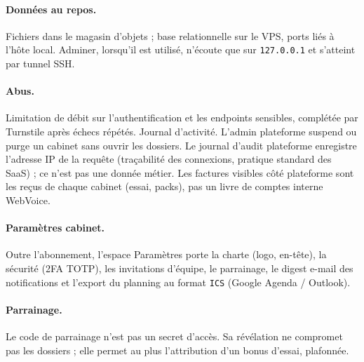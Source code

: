 \paragraph{Données au repos.}
Fichiers dans le magasin d'objets ; base relationnelle sur le VPS, ports liés à l'hôte local. Adminer, lorsqu'il est utilisé, n'écoute que sur \texttt{127.0.0.1} et s'atteint par tunnel SSH.

\paragraph{Abus.}
Limitation de débit sur l'authentification et les endpoints sensibles, complétée par Turnstile après échecs répétés. Journal d'activité. L'admin plateforme suspend ou purge un cabinet sans ouvrir les dossiers. Le journal d'audit plateforme enregistre l'adresse IP de la requête (traçabilité des connexions, pratique standard des SaaS) ; ce n'est pas une donnée métier. Les factures visibles côté plateforme sont les reçus de chaque cabinet (essai, packs), pas un livre de comptes interne WebVoice.

\paragraph{Paramètres cabinet.}
Outre l'abonnement, l'espace Paramètres porte la charte (logo, en-tête), la sécurité (2FA TOTP), les invitations d'équipe, le parrainage, le digest e-mail des notifications et l'export du planning au format \texttt{ICS} (Google Agenda / Outlook).

\paragraph{Parrainage.}
Le code de parrainage n'est pas un secret d'accès. Sa révélation ne compromet pas les dossiers ; elle permet au plus l'attribution d'un bonus d'essai, plafonnée.

